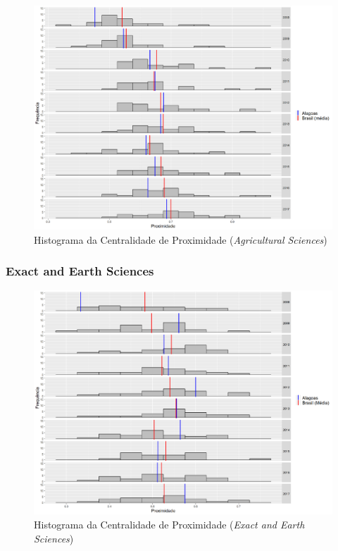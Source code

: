 \begin{figure}[H]
	\centering
	\includegraphics[scale=0.5]{Imagens/agricultural/closeness-hist.pdf}
	\caption{Histograma da Centralidade de Proximidade (\textit{Agricultural Sciences})}
	\label{hist-agri-close-1}
\end{figure}

\subsubsection{Exact and Earth Sciences}

\begin{figure}[H]
	\centering
	\includegraphics[scale=0.5]{Imagens/exact/closeness-hist.pdf}
	\caption{Histograma da Centralidade de Proximidade (\textit{Exact and Earth Sciences})}
	\label{hist-exact-close-1}
\end{figure}

